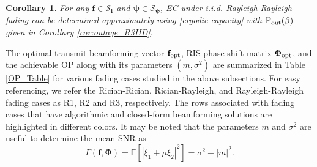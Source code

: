 \documentclass[journal,draftclsnofoot,onecolumn,12pt]{IEEEtran}
\newtheorem{corollary}{Corollary}[theorem]
\begin{document}
\vspace{-0.3cm}
\begin{corollary}
    For any $\mathbf{f}\in\mathcal{S}_\mathbf{f}$ and $\boldsymbol{\psi}\in\mathcal{S}_\mathbf{\boldsymbol{\psi}}$,  EC  under {\rm i.i.d.} Rayleigh-Rayleigh fading can be determined approximately using \eqref{ergodic capacity} with ${\rm P_{out}}(\beta)$ given in Corollary \ref{cor:outage_R3IID}.
\end{corollary}
\vspace{-0.3cm}
The optimal transmit beamforming vector $\mathbf{f}_{\rm opt}$, RIS phase shift matrix $\mathbf{\Phi}_{\rm opt}$, and the achievable OP along with its parameters $(m,\sigma^2)$ are summarized in Table \ref{OP_Table} for various fading cases studied in the above subsections. For easy referencing, we refer the Rician-Rician, Rician-Rayleigh, and Rayleigh-Rayleigh fading cases as R1, R2 and R3, respectively. The rows associated with fading cases that have algorithmic and closed-form beamforming solutions are highlighted in different colors.
It may be noted that the parameters $m$ and $\sigma^2$ are  useful to determine the mean SNR as $$\Gamma(\mathbf{f},\mathbf{\Phi})=\mathbb{E}[|\xi_1+\mu\xi_2|^2]=\sigma^2+|m|^2.$$
\end{document}
